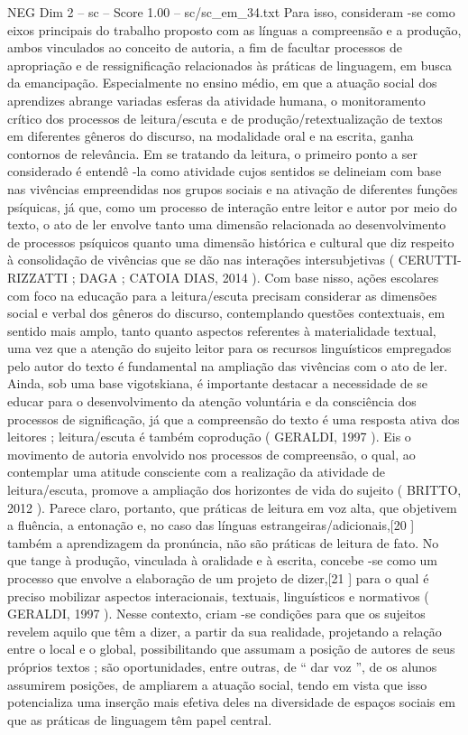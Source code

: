 \begin{textsample}{NEG Dim 2 – sc – Score 1.00 – sc/sc\_em\_34.txt}
Para isso, consideram -se como eixos principais do trabalho proposto com as línguas a compreensão e a produção, ambos vinculados ao conceito de autoria, a fim de facultar processos de apropriação e de ressignificação relacionados às práticas de linguagem, em busca da emancipação.
Especialmente no ensino médio, em que a atuação social dos aprendizes abrange variadas esferas da atividade humana, o monitoramento crítico dos processos de leitura/escuta e de produção/retextualização de textos em diferentes gêneros do discurso, na modalidade oral e na escrita, ganha contornos de relevância.
Em se tratando da leitura, o primeiro ponto a ser considerado é entendê -la como atividade cujos sentidos se delineiam com base nas vivências empreendidas nos grupos sociais e na ativação de diferentes funções psíquicas, já que, como um processo de interação entre leitor e autor por meio do texto, o ato de ler envolve tanto uma dimensão relacionada ao desenvolvimento de processos psíquicos quanto uma dimensão histórica e cultural que diz respeito à consolidação de vivências que se dão nas interações intersubjetivas ( CERUTTI-RIZZATTI ; DAGA ; CATOIA DIAS, 2014 ).
Com base nisso, ações escolares com foco na educação para a leitura/escuta precisam considerar as dimensões social e verbal dos gêneros do discurso, contemplando questões contextuais, em sentido mais amplo, tanto quanto aspectos referentes à materialidade textual, uma vez que a atenção do sujeito leitor para os recursos linguísticos empregados pelo autor do texto é fundamental na ampliação das vivências com o ato de ler.
Ainda, sob uma base vigotskiana, é importante destacar a necessidade de se educar para o desenvolvimento da atenção voluntária e da consciência dos processos de significação, já que a compreensão do texto é uma resposta ativa dos leitores ; leitura/escuta é também coprodução ( GERALDI, 1997 ).
Eis o movimento de autoria envolvido nos processos de compreensão, o qual, ao contemplar uma atitude consciente com a realização da atividade de leitura/escuta, promove a ampliação dos horizontes de vida do sujeito ( BRITTO, 2012 ).
Parece claro, portanto, que práticas de leitura em voz alta, que objetivem a fluência, a entonação e, no caso das línguas estrangeiras/adicionais,[20 ] também a aprendizagem da pronúncia, não são práticas de leitura de fato.
No que tange à produção, vinculada à oralidade e à escrita, concebe -se como um processo que envolve a elaboração de um projeto de dizer,[21 ] para o qual é preciso mobilizar aspectos interacionais, textuais, linguísticos e normativos ( GERALDI, 1997 ).
Nesse contexto, criam -se condições para que os sujeitos revelem aquilo que têm a dizer, a partir da sua realidade, projetando a relação entre o local e o global, possibilitando que assumam a posição de autores de seus próprios textos ; são oportunidades, entre outras, de “ dar voz ”, de os alunos assumirem posições, de ampliarem a atuação social, tendo em vista que isso potencializa uma inserção mais efetiva deles na diversidade de espaços sociais em que as práticas de linguagem têm papel central.

\end{textsample}
